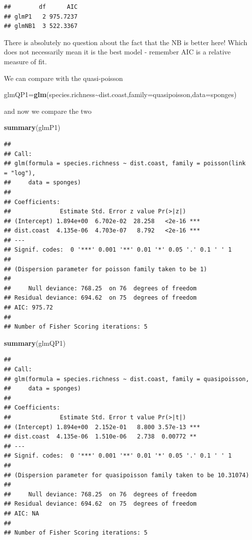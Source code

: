 \documentclass[
]{book}
\newenvironment{Shaded}{\begin{snugshade}}{\end{snugshade}}
\newcommand{\AttributeTok}[1]{\textcolor[rgb]{0.13,0.29,0.53}{#1}}
\newcommand{\FunctionTok}[1]{\textcolor[rgb]{0.13,0.29,0.53}{\textbf{#1}}}
\newcommand{\NormalTok}[1]{#1}
\newcommand{\OtherTok}[1]{\textcolor[rgb]{0.56,0.35,0.01}{#1}}
\newcommand{\SpecialCharTok}[1]{\textcolor[rgb]{0.81,0.36,0.00}{\textbf{#1}}}
\begin{document}
\begin{verbatim}
##        df      AIC
## glmP1   2 975.7237
## glmNB1  3 522.3367
\end{verbatim}

There is absolutely no question about the fact that the NB is better here! Which does not necessarily mean it is the best model - remember AIC is a relative measure of fit.

We can compare with the quasi-poisson

\begin{Shaded}
\begin{Highlighting}[]
\NormalTok{glmQP1}\OtherTok{=}\FunctionTok{glm}\NormalTok{(species.richness}\SpecialCharTok{\textasciitilde{}}\NormalTok{dist.coast,}\AttributeTok{family=}\NormalTok{quasipoisson,}\AttributeTok{data=}\NormalTok{sponges)}
\end{Highlighting}
\end{Shaded}

and now we compare the two

\begin{Shaded}
\begin{Highlighting}[]
\FunctionTok{summary}\NormalTok{(glmP1)}
\end{Highlighting}
\end{Shaded}

\begin{verbatim}
## 
## Call:
## glm(formula = species.richness ~ dist.coast, family = poisson(link = "log"), 
##     data = sponges)
## 
## Coefficients:
##              Estimate Std. Error z value Pr(>|z|)    
## (Intercept) 1.894e+00  6.702e-02  28.258   <2e-16 ***
## dist.coast  4.135e-06  4.703e-07   8.792   <2e-16 ***
## ---
## Signif. codes:  0 '***' 0.001 '**' 0.01 '*' 0.05 '.' 0.1 ' ' 1
## 
## (Dispersion parameter for poisson family taken to be 1)
## 
##     Null deviance: 768.25  on 76  degrees of freedom
## Residual deviance: 694.62  on 75  degrees of freedom
## AIC: 975.72
## 
## Number of Fisher Scoring iterations: 5
\end{verbatim}

\begin{Shaded}
\begin{Highlighting}[]
\FunctionTok{summary}\NormalTok{(glmQP1)}
\end{Highlighting}
\end{Shaded}

\begin{verbatim}
## 
## Call:
## glm(formula = species.richness ~ dist.coast, family = quasipoisson, 
##     data = sponges)
## 
## Coefficients:
##              Estimate Std. Error t value Pr(>|t|)    
## (Intercept) 1.894e+00  2.152e-01   8.800 3.57e-13 ***
## dist.coast  4.135e-06  1.510e-06   2.738  0.00772 ** 
## ---
## Signif. codes:  0 '***' 0.001 '**' 0.01 '*' 0.05 '.' 0.1 ' ' 1
## 
## (Dispersion parameter for quasipoisson family taken to be 10.31074)
## 
##     Null deviance: 768.25  on 76  degrees of freedom
## Residual deviance: 694.62  on 75  degrees of freedom
## AIC: NA
## 
## Number of Fisher Scoring iterations: 5
\end{verbatim}
\end{document}
